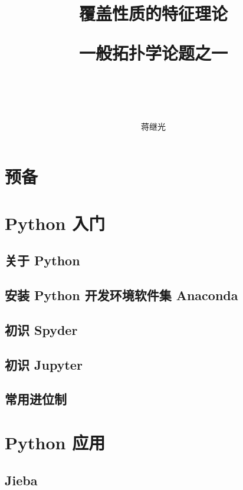 \documentclass[zihao=-4,heading=true,a4paper,twoside,openany]{ctexbook}
\title{
覆盖性质的特征理论\\
	\begin{kaishu}一般拓扑学论题之一\end{kaishu}\\
}
\author{\kaishu 蒋继光}
\date{}
\begin{document}
\begin{titlepage}
	\maketitle
\end{titlepage}

\setcounter{page}{5}%
{}
\tableofcontents

\mainmatter
{}


\chapter{预备}\label{chap:1}



\chapter{Python 入门}\label{chap2}
\section{关于 Python}\label{chap:2.1}
\section{安装 Python 开发环境软件集 Anaconda}
 \label{chap:2.2}

\section{初识 Spyder}
 \label{chap:2.3}
\section{初识 Jupyter}
\label{chap:2.4}

\section{常用进位制}\label{sec:I.2}


\chapter{Python 应用}
\section{Jieba}

\end{document}
